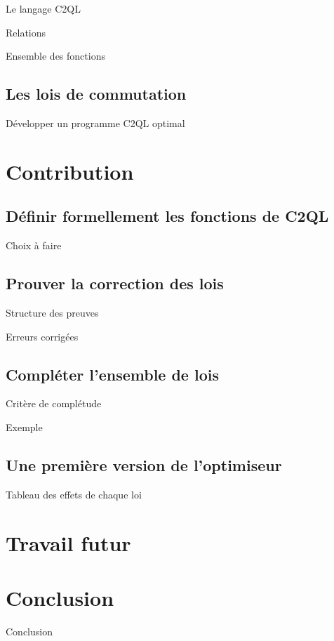 \documentclass{beamer}
\begin{document}
\begin{frame}{Le langage C2QL}
\end{frame}

\begin{frame}{Relations}
\end{frame}

\begin{frame}{Ensemble des fonctions }
\end{frame}

\subsection{Les lois de commutation}
\begin{frame}{Développer un programme C2QL optimal}
\end{frame}

\section{Contribution}
\subsection{Définir formellement les fonctions de C2QL}
\begin{frame}{Choix à faire}
\end{frame}

\subsection{Prouver la correction des lois}
\begin{frame}{Structure des preuves}
\end{frame}

\begin{frame}{Erreurs corrigées}
\end{frame}

\subsection{Compléter l'ensemble de lois}
\begin{frame}{Critère de complétude}
\end{frame}

\begin{frame}{Exemple}
\end{frame}

\subsection{Une première version de l'optimiseur}
\begin{frame}{Tableau des effets de chaque loi}
\end{frame}

\section{Travail futur}
\begin{frame}
\end{frame}

\section*{Conclusion}
\begin{frame}{Conclusion}
\end{frame}
\end{document}
